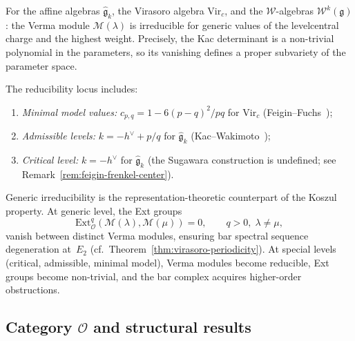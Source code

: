 \begin{proposition}
\label{prop:generic-irreducibility}
For the affine algebras $\widehat{\mathfrak{g}}_k$, the Virasoro algebra
$\mathrm{Vir}_c$, and the $\mathcal{W}$-algebras $\mathcal{W}^k(\mathfrak{g})$:
the Verma module $\mathcal{M}(\lambda)$ is irreducible for generic values
of the level\/central charge and the highest weight. Precisely, the Kac
determinant is a non-trivial polynomial in the parameters, so its
vanishing defines a proper subvariety of the parameter space.

The reducibility locus includes:
\begin{enumerate}[label=(\roman*)]
\item \emph{Minimal model values:} $c_{p,q} = 1 - 6(p-q)^2/pq$
 for $\mathrm{Vir}_c$ (Feigin--Fuchs~\cite{FF84});
\item \emph{Admissible levels:} $k = -h^\vee + p/q$ for
 $\widehat{\mathfrak{g}}_k$ (Kac--Wakimoto~\cite{KW88});
\item \emph{Critical level:} $k = -h^\vee$ for
 $\widehat{\mathfrak{g}}_k$ (the Sugawara construction is
 undefined; see Remark~\ref{rem:feigin-frenkel-center}).
\end{enumerate}
\end{proposition}

\begin{remark}\label{rem:verma-koszul}
Generic irreducibility is the representation-theoretic
counterpart of the Koszul property. At generic level, the Ext groups
\[
\mathrm{Ext}^q_{\mathcal{O}}(\mathcal{M}(\lambda),
\mathcal{M}(\mu)) = 0, \qquad q > 0,\; \lambda \neq \mu,
\]
vanish between distinct Verma modules, ensuring bar spectral sequence
degeneration at~$E_2$ (cf.\ Theorem~\ref{thm:virasoro-periodicity}).
At special levels (critical, admissible, minimal model), Verma modules
become reducible, Ext groups become non-trivial, and the bar complex
acquires higher-order obstructions.
\end{remark}

\subsection{Category \texorpdfstring{$\mathcal{O}$}{O} and structural results}

